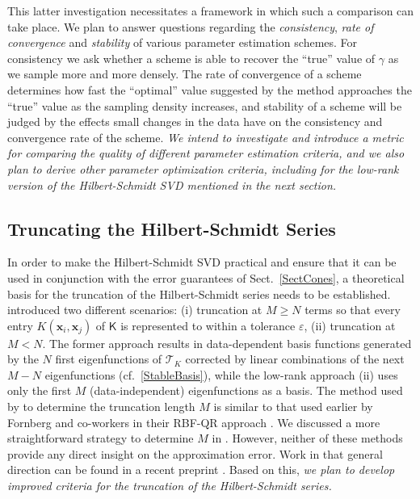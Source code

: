 \documentclass[11pt]{NSFamsart}
\newcommand{\mK}{\mathsf{K}}
\newcommand{\bx}{{\boldsymbol{x}}}
\newcommand{\cT}{\mathcal{T}}
\begin{document}
This latter investigation necessitates a framework in which such a comparison can take place. We plan to answer questions regarding the \emph{consistency}, \emph{rate of convergence} and \emph{stability} of various parameter estimation schemes. For consistency we ask whether a scheme is able to recover the ``true'' value of $\gamma$ as we sample more and more densely. The rate of convergence of a scheme determines how fast the ``optimal'' value suggested by the method approaches the ``true'' value as the sampling density increases, and stability of a scheme will be judged by the effects small changes in the data have on the consistency and convergence rate of the scheme. \emph{We intend to investigate and introduce a metric for comparing the quality of different parameter estimation criteria, and we also plan to derive other parameter optimization criteria, including for the low-rank version of the Hilbert-Schmidt SVD mentioned in the next section.}


\subsection{Truncating the Hilbert-Schmidt Series}\label{Sec_TruncHS}
In order to make the Hilbert-Schmidt SVD practical and ensure that it can be used in conjunction with the error guarantees of Sect.~\ref{SectCones}, a theoretical basis for the truncation of the Hilbert-Schmidt series needs to be established. \cite{FMcC12} introduced two different scenarios: (i) truncation at $M\ge N$ terms so that every entry $K(\bx_i,\bx_j)$ of $\mK$ is represented to within a tolerance $\varepsilon$, (ii) truncation at $M < N$. The former approach results in data-dependent basis functions generated by the $N$ first eigenfunctions of $\cT_K$ corrected by linear combinations of the next $M-N$ eigenfunctions (cf.~\eqref{StableBasis}), while the low-rank approach (ii) uses only the first $M$ (data-independent) eigenfunctions as a basis. The method used by \cite{FMcC12} to determine the truncation length $M$ is similar to that used earlier by Fornberg and co-workers in their RBF-QR approach \citep{FornbergPiret08, FornbergFlyerLarsson11}.  We discussed a more straightforward strategy to determine $M$ in \cite{CFMcC13}. However, neither of these methods provide any direct insight on the approximation error. Work in that general direction can be found in a recent preprint \citep{GriebelRiegerZwicknagl13}. Based on this, \emph{we plan to develop improved criteria for the truncation of the Hilbert-Schmidt series.}
\end{document}
